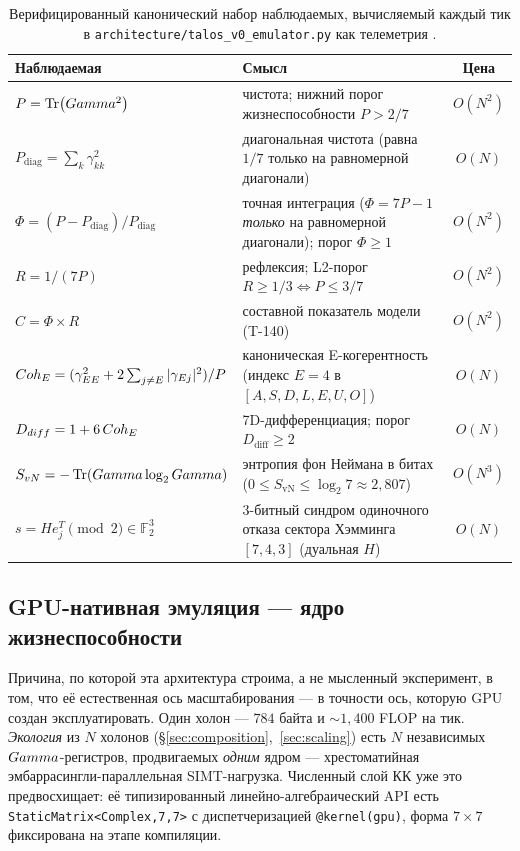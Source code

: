 \begin{table}[H]
\centering\small
\caption{Верифицированный канонический набор наблюдаемых, вычисляемый каждый тик
в \texttt{architecture/talos\_v0\_emulator.py} как телеметрия \TALOS{}.}
\label{tab:observables}
\begin{tabular}{@{}p{3.9cm}p{5.8cm}c@{}}
\toprule
\textbf{Наблюдаемая} & \textbf{Смысл} & \textbf{Цена} \\
\midrule
$P=\Tr(Gamma^2)$ & чистота; нижний порог жизнеспособности $P>2/7$ & $O(N^2)$ \\
$P_{\mathrm{diag}}=\sum_k \gamma_{kk}^2$ & диагональная чистота (равна $1/7$ только на равномерной диагонали) & $O(N)$ \\
$\Phi=(P-P_{\mathrm{diag}})/P_{\mathrm{diag}}$ & точная интеграция ($\Phi=7P-1$ \emph{только} на равномерной диагонали); порог $\Phi\ge 1$ & $O(N^2)$ \\
$R=1/(7P)$ & рефлексия; L2-порог $R\ge 1/3\Leftrightarrow P\le 3/7$ & $O(N^2)$ \\
$C=\Phi\times R$ & составной показатель модели (T-140) & $O(N^2)$ \\
$Coh_E=(\gamma_{EE}^2+2\sum_{j\neq E}|\gamma_{Ej}|^2)/P$ & каноническая E-когерентность (индекс $E=4$ в $[A,S,D,L,E,U,O]$) & $O(N)$ \\
$D_{diff}=1+6\,Coh_E$ & 7D-дифференциация; порог $D_{\mathrm{diff}}\ge 2$ & $O(N)$ \\
$S_{vN}=-\Tr(Gamma\log_2Gamma)$ & энтропия фон Неймана в битах ($0\le S_{\mathrm{vN}}\le\log_2 7\approx 2{,}807$) & $O(N^3)$ \\
$s = He_j^T\pmod 2\in\mathbb{F}_2^3$ & $3$-битный синдром одиночного отказа сектора Хэмминга $[7,4,3]$ (дуальная $H$) & $O(N)$ \\
\bottomrule
\end{tabular}
\end{table}

\subsection{GPU-нативная эмуляция --- ядро жизнеспособности}
\label{subsec:gpu}

Причина, по которой эта архитектура строима, а не мысленный эксперимент, в том,
что её естественная ось масштабирования --- в точности ось, которую GPU создан
эксплуатировать. Один холон --- $784$ байта и ${\sim}1{,}400$ FLOP на тик.
\emph{Экология} из $N$ холонов (\S\ref{sec:composition},~\ref{sec:scaling}) есть
$N$ независимых $Gamma$-регистров, продвигаемых \emph{одним} ядром --- хрестоматийная
эмбаррасингли-параллельная SIMT-нагрузка. Численный слой КК уже это предвосхищает:
её типизированный линейно-алгебраический API есть
\texttt{StaticMatrix<Complex,7,7>} с диспетчеризацией \texttt{@kernel(gpu)},
форма $7\times7$ фиксирована на этапе компиляции.

